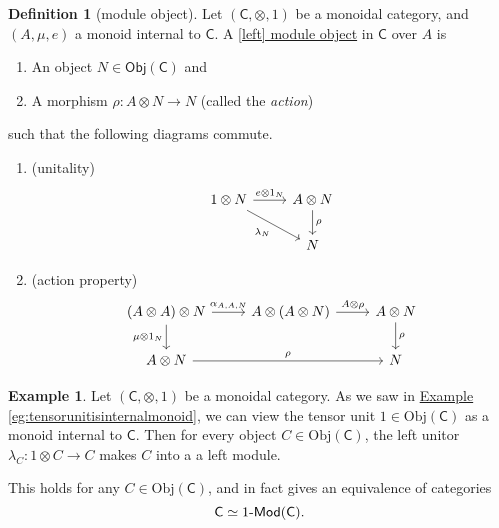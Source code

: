 \documentclass[a4paper,10pt]{scrreprt}
\newcommand{\defn}[1]{\ul{#1}}
\newcommand{\Obj}{\mathrm{Obj}}
\def\mhyp{{\hbox{-}}}
\theoremstyle{definition}
\newtheorem{definition}{Definition}[section]
\newtheorem{example}{Example}[section]
\theoremstyle{plain}
\theoremstyle{remark}
\begin{document}
\begin{definition}[module object]
  \label{def:moduleobject}
  Let $(\mathsf{C}, \otimes, 1)$ be a monoidal category, and $(A, \mu, e)$ a monoid internal to $\mathsf{C}$. A \defn{[left] module object} in $\mathsf{C}$ over $A$ is
  \begin{enumerate}
    \item An object $N \in \mathsf{Obj}(\mathsf{C})$ and

    \item A morphism $\rho\colon A \otimes N \to N$ (called the \emph{action})
  \end{enumerate}
  such that the following diagrams commute.
  \begin{enumerate}
    \item (unitality)
      \begin{equation*}
        \begin{tikzcd}
          1 \otimes N
          \arrow[r, "e \otimes 1_{N}"]
          \arrow[dr, swap, "\lambda_{N}"]
          & A \otimes N
          \arrow[d, "\rho"]
          \\
          & N
        \end{tikzcd}
      \end{equation*}

    \item (action property)
      \begin{equation*}
        \begin{tikzcd}
          (A \otimes A) \otimes N
          \arrow[r, "{\alpha_{A, A, N}}"]
          \arrow[d, swap, "\mu \otimes 1_{N}"]
          & A \otimes (A \otimes N)
          \arrow[r, "A \otimes \rho"]
          & A \otimes N
          \arrow[d, "\rho"]
          \\
          A \otimes N
          \arrow[rr, "\rho"]
          & & N
        \end{tikzcd}
      \end{equation*}
  \end{enumerate}
\end{definition}

\begin{example}
  \label{eg:categoryof1modulesisequivalenttocategoryitself}
  Let $(\mathsf{C}, \otimes, 1)$ be a monoidal category. As we saw in \hyperref[eg:tensorunitisinternalmonoid]{Example \ref*{eg:tensorunitisinternalmonoid}}, we can view the tensor unit $1 \in \Obj(\mathsf{C})$ as a monoid internal to $\mathsf{C}$. Then for every object $C \in \Obj(\mathsf{C})$, the left unitor $\lambda_{C}\colon 1 \otimes C \to C$ makes $C$ into a a left module.

  This holds for any $C \in \Obj(\mathsf{C})$, and in fact gives an equivalence of categories
  \begin{equation*}
    \mathsf{C} \simeq 1\mhyp\mathsf{Mod}(\mathsf{C}).
  \end{equation*}
\end{example}
\end{document}

